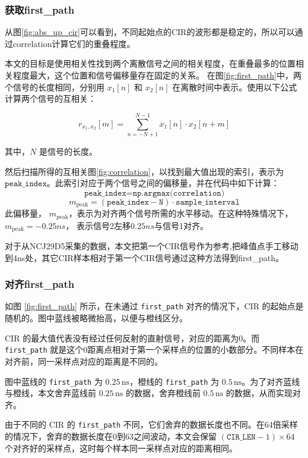 \subsubsection{获取first\_path}
从图\ref{fig:abs_up_cir}可以看到，不同起始点的CIR的波形都是稳定的，所以可以通过correlation计算它们的重叠程度。

本文的目标是使用相关性找到两个离散信号之间的相关程度，在重叠最多的位置相关程度最大，这个位置和信号偏移量存在固定的关系。
在图\ref{fig:first_path}中，两个信号的长度相同，分别用 \( x_1[n] \) 和 \( x_2[n] \) 在离散时间中表示。使用以下公式计算两个信号的互相关：

\[
r_{x_1, x_2}[m] = \sum_{n=-N+1}^{N-1} x_1[n] \cdot x_2[n+m]
\]

其中，\( N \) 是信号的长度。

然后扫描所得的互相关图\ref{fig:correlation}，以找到最大值出现的索引，表示为 \( \texttt{peak\_index} \)。此索引对应于两个信号之间的偏移量，并在代码中如下计算：
\[
\texttt{peak\_index} = \texttt{np.argmax(correlation)}
\]
\[
m_{\text{peak}}  = (\texttt{peak\_index} - \texttt{N}) \cdot \texttt{sample\_interval}
\]
此偏移量， \( m_{\text{peak}} \)，表示为对齐两个信号所需的水平移动。在这种特殊情况下，\( m_{\text{peak}} = -0.25ns \)， 表示信号2左移\(0.25ns\)与信号1对齐。

对于从NCJ29D5采集的数据，本文把第一个CIR信号作为参考,把峰值点手工移动到4ns处，其它CIR样本相对于第一个CIR信号通过这种方法得到first\_path。


\subsubsection{对齐first\_path}
如图 \ref{fig:first_path} 所示，在未通过 \texttt{first\_path} 对齐的情况下，CIR 的起始点是随机的。图中蓝线被略微抬高，以便与橙线区分。

CIR 的最大值代表没有经过任何反射的直射信号，对应的距离为0。而 \texttt{first\_path} 就是这个0距离点相对于第一个采样点的位置的小数部分。不同样本在对齐前，同一采样点对应的距离是不同的。

图中蓝线的 \texttt{first\_path} 为 \(0.25\, \text{ns}\)，橙线的 \texttt{first\_path} 为 \(0.5\, \text{ns}\)。为了对齐蓝线与橙线，本文舍弃蓝线前 \(0.25\, \text{ns}\) 的数据，舍弃橙线前 \(0.5\, \text{ns}\) 的数据，从而实现对齐。

由于不同的 CIR 的 \texttt{first\_path} 不同，它们舍弃的数据长度也不同。在64倍采样的情况下，舍弃的数据长度在0到63之间波动，本文会保留 \((\texttt{CIR\_LEN}-1) \times 64\) 个对齐好的采样点，这时每个样本同一采样点对应的距离相同。

